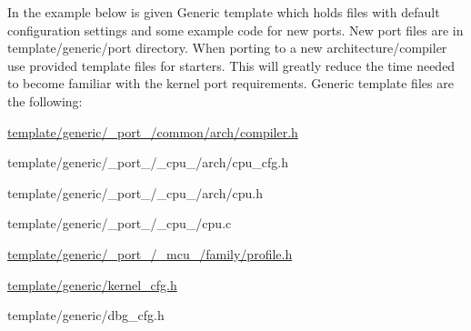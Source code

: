 In the example below is given {\ttfamily Generic} template which holds files with default configuration settings and some example code for new ports. New port files are in template/generic/port directory. When porting to a new architecture/compiler use provided template files for starters. This will greatly reduce the time needed to become familiar with the kernel port requirements. Generic template files are the following\-:
\begin{DoxyItemize}
\item {\ttfamily \hyperlink{compiler_8h}{template/generic/\-\_\-port\-\_\-/common/arch/compiler.\-h}}
\item {\ttfamily template/generic/\-\_\-port\-\_\-/\-\_\-cpu\-\_\-/arch/cpu\-\_\-cfg.\-h}
\item {\ttfamily template/generic/\-\_\-port\-\_\-/\-\_\-cpu\-\_\-/arch/cpu.\-h}
\item {\ttfamily template/generic/\-\_\-port\-\_\-/\-\_\-cpu\-\_\-/cpu.\-c}
\item {\ttfamily \hyperlink{profile_8h}{template/generic/\-\_\-port\-\_\-/\-\_\-mcu\-\_\-/family/profile.\-h}}
\item {\ttfamily \hyperlink{kernel__cfg_8h}{template/generic/kernel\-\_\-cfg.\-h}}
\item {\ttfamily template/generic/dbg\-\_\-cfg.\-h} 
\end{DoxyItemize}